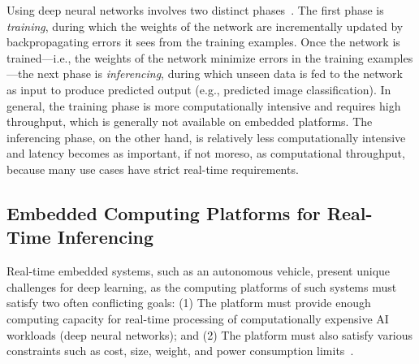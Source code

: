 Using deep neural networks involves two distinct
phases~\cite{NVIDIA2015}. The first
phase is \emph{training}, during which the weights of the network are
incrementally updated by backpropagating errors it sees from the
training examples. Once the network is trained---i.e., the weights of
the network minimize errors in the training examples---the next phase
is \emph{inferencing}, during which unseen data is fed to the network
as input to produce predicted output (e.g., predicted image
classification). In general, the training phase is more computationally
intensive and requires high throughput, which is generally not
available on embedded platforms. The inferencing phase, on the
other hand, is relatively less computationally intensive and latency becomes
as important, if not moreso, as computational throughput, because many
use cases have strict real-time requirements.






\subsection{Embedded Computing Platforms for Real-Time Inferencing}
Real-time embedded systems, such as an autonomous vehicle, present
unique challenges for deep learning, as the computing platforms of such
systems must satisfy two often conflicting goals:
(1) The platform must provide 
enough computing capacity for real-time processing of computationally
expensive AI workloads (deep neural networks); and
(2) The platform must also satisfy various
constraints such as cost, size, weight, and power consumption limits~\cite{Otterness2017}.

